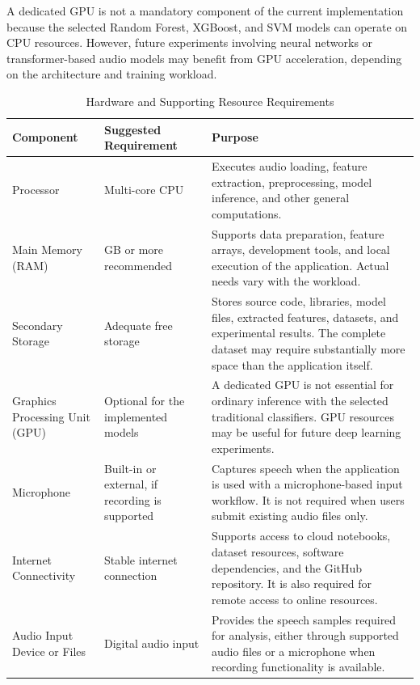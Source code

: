 \documentclass[12pt,a4paper]{report}
\begin{document}
A dedicated GPU is not a mandatory component of the current implementation because the selected Random Forest, XGBoost, and SVM models can operate on CPU resources. However, future experiments involving neural networks or transformer-based audio models may benefit from GPU acceleration, depending on the architecture and training workload.
\begin{table}[H]
\centering
\small
\renewcommand{\arraystretch}{1.4}

\begin{tabularx}{\textwidth}{
    >{\raggedright\arraybackslash}p{}
    >{\raggedright\arraybackslash}p{}
    >{\raggedright\arraybackslash}X
}
\toprule
\textbf{Component} & \textbf{Suggested Requirement} & \textbf{Purpose} \\
\midrule

Processor &
Multi-core CPU &
Executes audio loading, feature extraction, preprocessing, model inference, and other general computations. \\

Main Memory (RAM) &
8 GB or more recommended &
Supports data preparation, feature arrays, development tools, and local execution of the application. Actual needs vary with the workload. \\

Secondary Storage &
Adequate free storage &
Stores source code, libraries, model files, extracted features, datasets, and experimental results. The complete dataset may require substantially more space than the application itself. \\

Graphics Processing Unit (GPU) &
Optional for the implemented models &
A dedicated GPU is not essential for ordinary inference with the selected traditional classifiers. GPU resources may be useful for future deep learning experiments. \\

Microphone &
Built-in or external, if recording is supported &
Captures speech when the application is used with a microphone-based input workflow. It is not required when users submit existing audio files only. \\

Internet Connectivity &
Stable internet connection &
Supports access to cloud notebooks, dataset resources, software dependencies, and the GitHub repository. It is also required for remote access to online resources. \\

Audio Input Device or Files &
Digital audio input &
Provides the speech samples required for analysis, either through supported audio files or a microphone when recording functionality is available. \\

\bottomrule
\end{tabularx}

\caption{Hardware and Supporting Resource Requirements}
\label{tab:hardware-environment}
\end{table}
\end{document}
